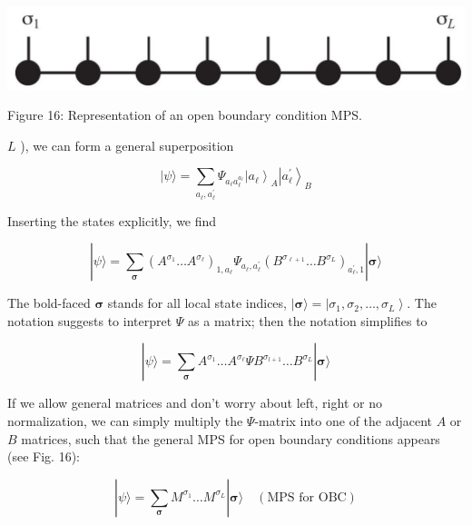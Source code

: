 \documentclass[12pt]{article}
\begin{document}
\begin{center}
\includegraphics[max width=\textwidth]{2024_05_04_afc4ad226da9ccfe0ac8g-029(1)}
\end{center}

Figure 16: Representation of an open boundary condition MPS.

$L$ ), we can form a general superposition


\begin{equation*}
|\psi\rangle=\sum_{a_{\ell}, a_{\ell}^{\prime}} \Psi_{a_{\ell} a_{\ell}^{a_{\ell}}}\left|a_{\ell}\right\rangle_{A}\left|a_{\ell}^{\prime}\right\rangle_{B} \tag{72}
\end{equation*}


Inserting the states explicitly, we find


\begin{equation*}
|\psi\rangle=\sum_{\boldsymbol{\sigma}}\left(A^{\sigma_{1}} \ldots A^{\sigma_{\ell}}\right)_{1, a_{\ell}} \Psi_{a_{\ell}, a_{\ell}^{\prime}}\left(B^{\sigma_{\ell+1}} \ldots B^{\sigma_{L}}\right)_{a_{\ell}^{\prime}, 1}|\boldsymbol{\sigma}\rangle \tag{73}
\end{equation*}


The bold-faced $\boldsymbol{\sigma}$ stands for all local state indices, $|\boldsymbol{\sigma}\rangle=\left|\sigma_{1}, \sigma_{2}, \ldots, \sigma_{L}\right\rangle$. The notation suggests to interpret $\Psi$ as a matrix; then the notation simplifies to


\begin{equation*}
|\psi\rangle=\sum_{\boldsymbol{\sigma}} A^{\sigma_{1}} \ldots A^{\sigma_{\ell}} \Psi B^{\sigma_{l+1}} \ldots B^{\sigma_{L}}|\boldsymbol{\sigma}\rangle \tag{74}
\end{equation*}


If we allow general matrices and don't worry about left, right or no normalization, we can simply multiply the $\Psi$-matrix into one of the adjacent $A$ or $B$ matrices, such that the general MPS for open boundary conditions appears (see Fig. 16):


\begin{equation*}
|\psi\rangle=\sum_{\boldsymbol{\sigma}} M^{\sigma_{1}} \ldots M^{\sigma_{L}}|\boldsymbol{\sigma}\rangle \quad(\mathrm{MPS} \text { for } \mathrm{OBC}) \tag{75}
\end{equation*}
\end{document}
